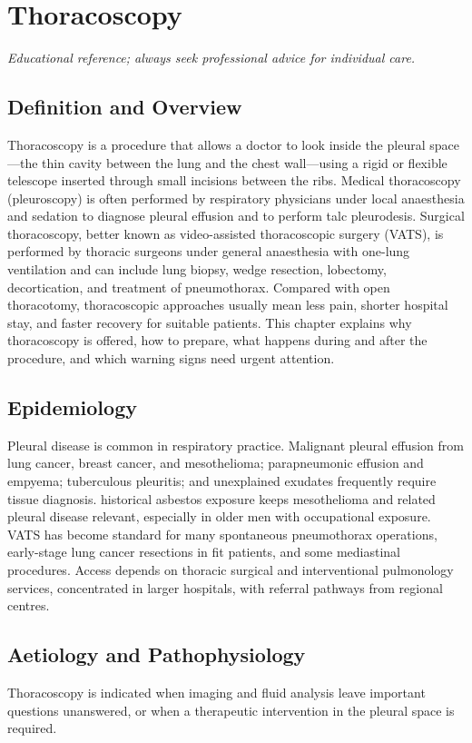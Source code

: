 \chapter{Thoracoscopy}

\medskip
\noindent\textit{Educational reference; always seek professional advice for individual care.}

\section*{Definition and Overview}
Thoracoscopy is a procedure that allows a doctor to look inside the pleural space---the thin cavity between the lung and the chest wall---using a rigid or flexible telescope inserted through small incisions between the ribs. Medical thoracoscopy (pleuroscopy) is often performed by respiratory physicians under local anaesthesia and sedation to diagnose pleural effusion and to perform talc pleurodesis. Surgical thoracoscopy, better known as video-assisted thoracoscopic surgery (VATS), is performed by thoracic surgeons under general anaesthesia with one-lung ventilation and can include lung biopsy, wedge resection, lobectomy, decortication, and treatment of pneumothorax. Compared with open thoracotomy, thoracoscopic approaches usually mean less pain, shorter hospital stay, and faster recovery for suitable patients. This chapter explains why thoracoscopy is offered, how to prepare, what happens during and after the procedure, and which warning signs need urgent attention.

\section*{Epidemiology}
Pleural disease is common in respiratory practice. Malignant pleural effusion from lung cancer, breast cancer, and mesothelioma; parapneumonic effusion and empyema; tuberculous pleuritis; and unexplained exudates frequently require tissue diagnosis. historical asbestos exposure keeps mesothelioma and related pleural disease relevant, especially in older men with occupational exposure. VATS has become standard for many spontaneous pneumothorax operations, early-stage lung cancer resections in fit patients, and some mediastinal procedures. Access depends on thoracic surgical and interventional pulmonology services, concentrated in larger hospitals, with referral pathways from regional centres.

\section*{Aetiology and Pathophysiology}
Thoracoscopy is indicated when imaging and fluid analysis leave important questions unanswered, or when a therapeutic intervention in the pleural space is required.

